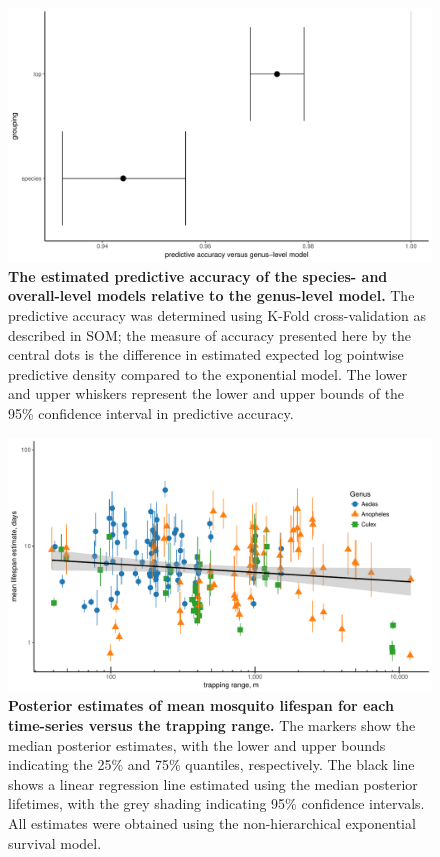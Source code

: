 \documentclass[12pt]{article}
\begin{document}
\begin{figure}[h]
	\centerline{\includegraphics[width=1\textwidth]{./Figure_files/mrr_genus_vs_species_vs_top.pdf}}
	\caption{\textbf{The estimated predictive accuracy of the species- and overall-level models relative to the genus-level model.} The predictive accuracy was determined using K-Fold cross-validation as described in SOM; the measure of accuracy presented here by the central dots is the difference in estimated expected log pointwise predictive density compared to the exponential model. The lower and upper whiskers represent the lower and upper bounds of the 95\% confidence interval in predictive accuracy.}
	\label{fig:mrr_genusTopLevel}
\end{figure}

\begin{figure}[h]
	\centerline{\includegraphics[width=1\textwidth]{./Figure_files/mrr_lifeSpanVsRange.pdf}}
	\caption{\textbf{Posterior estimates of mean mosquito lifespan for each time-series versus the trapping range.} The markers show the median posterior estimates, with the lower and upper bounds indicating the 25\% and 75\% quantiles, respectively. The black line shows a linear regression line estimated using the median posterior lifetimes, with the grey shading indicating 95\% confidence intervals. All estimates were obtained using the non-hierarchical exponential survival model.}
	\label{fig:mrr_lifeSpanVsRange}
\end{figure}
\end{document}
